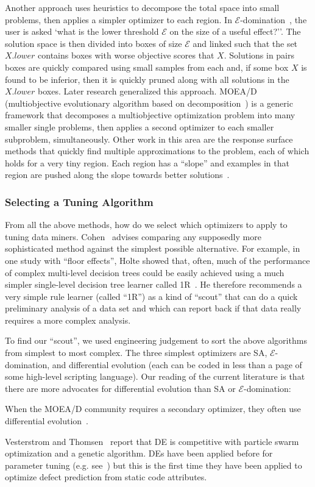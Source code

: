  
Another approach uses
    heuristics to decompose the total space into   small problems,   then applies a
    simpler optimizer to each region. 
In $\mathcal{E}$-domination~\cite{deb05}, the  user is asked
`what is the lower threshold $\mathcal{E}$ on the size of a useful effect?''. The solution space
is then divided into boxes of size $\mathcal{E}$ and linked such that  the  set $X.\mathit{lower}$ contains boxes with worse objective scores that $X$.  Solutions in pairs boxes are  quickly compared  using   small samples from each  and, if some box $X$ is found to be inferior, then it is quickly pruned along with all
solutions in the $X.\mathit{lower}$ boxes.
Later research generalized this approach. MOEA/D (multiobjective
evolutionary algorithm based on decomposition~\cite{zhang07}) is a generic framework that decomposes a multiobjective optimization problem into many smaller single problems, then applies a second optimizer to each smaller subproblem, simultaneously.   Other work in this area are the response surface methods
that quickly find multiple approximations to the problem, each of which holds for a very tiny region.
Each region has a ``slope'' and examples in that region are pushed along the slope towards better
solutions~\cite{krall15,Zuluaga:13}.
 
 
 \subsubsection{Selecting a Tuning Algorithm}
 
From all the above methods, how do we select which optimizers to apply to tuning data miners.
Cohen~\cite{cohen95} advises comparing any supposedly more
sophisticated method against the simplest possible alternative. For
example, in one study with ``floor effects'', Holte showed that,
often, much of the performance of complex multi-level decision trees
could be easily achieved using a much simpler single-level decision
tree learner called 1R~\cite{holte93}. He therefore recommends a very simple rule learner
(called ``1R'') as a
kind of ``scout'' that can do a quick preliminary analysis of a data
set and which can report back if that data really requires a more
complex analysis.

To find our ``scout'',  we used engineering judgement to sort  the above algorithms from simplest to most complex.
The three simplest optimizers are SA, $\mathcal{E}$-domination, and 
differential evolution (each can be coded in less than a page of some high-level scripting language). Our reading of the current literature is that there are more  advocates for
differential evolution than
  SA or $\mathcal{E}$-domination:
  \bi
  \item
  When the MOEA/D community requires a secondary optimizer, they often use  differential evolution~\cite{zhang07,5583335}.
  \item
 Vesterstrom and Thomsen~\cite{Vesterstrom04} report that DE is competitive with 
   particle swarm optimization and a genetic algorithm. 
   \ei
DEs have been applied before for   parameter tuning (e.g. see~\cite{omran2005differential, chiha2012tuning}) but this is the first time they have been applied to
optimize defect prediction from static code attributes.  


 
 

 